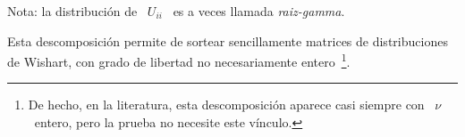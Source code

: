%
Nota: la distribuci\'on de \ $U_{ii}$ \ es a veces llamada {\em raiz-gamma}.

Esta   descomposici\'on   permite   de   sortear   sencillamente   matrices   de
distribuciones   de   Wishart,  con   grado   de   libertad  no   necesariamente
entero~\footnote{De hecho, en la  literatura, esta descomposici\'on aparece casi
  siempre con \ $\nu$ \ entero, pero la prueba no necesite este v\'inculo.}.
